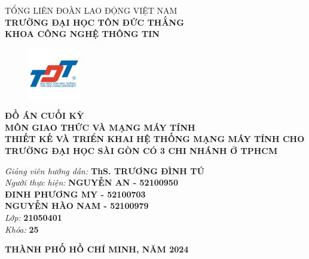 \documentclass[12pt, a4paper]{article}
\begin{document}
	\newpage
	\begin{center} 
		\large TỔNG LIÊN ĐOÀN LAO ĐỘNG VIỆT NAM 
		\\ \textbf{TRƯỜNG ĐẠI HỌC TÔN ĐỨC THẮNG} 
		\\ \textbf{KHOA CÔNG NGHỆ THÔNG TIN} 
		\large
		\begin{figure}[H]
			\centering
			\includegraphics[width=0.2\textwidth]{logo_tdtu.jpg}
			\label{fig:logoTDT_1}
		\end{figure}
		{\large \textbf{ĐỒ ÁN CUỐI KỲ\\}}
		{\large \textbf{MÔN GIAO THỨC VÀ MẠNG MÁY TÍNH}}
		\\ [35pt]
		{\huge \textbf{THIẾT KẾ VÀ TRIỂN KHAI HỆ THỐNG MẠNG MÁY TÍNH CHO TRƯỜNG ĐẠI HỌC SÀI GÒN CÓ 3 CHI NHÁNH Ở TPHCM}}\\ [35pt]
		\begin{flushright}
			{\large \textit{Giảng viên hướng dẫn: }} 
			\textbf{ThS. TRƯƠNG ĐÌNH TÚ } \\
			{\large \textit{Người thực hiện: }} 
			\textbf{NGUYỄN AN - 52100950} \\
			\textbf{ĐINH PHƯƠNG MY  - 52100703} \\
			\textbf{NGUYỄN HÀO NAM - 52100979} \\	
			{\large \textit{Lớp: }} 
			\textbf{21050401 } \\
			{\large \textit{Khóa: }} 
			\textbf{25} \\ [35pt]
		\end{flushright} 
		{\large \textbf{THÀNH PHỐ HỒ CHÍ MINH, NĂM 2024}}\\
	\end{center}
	
\end{document}
